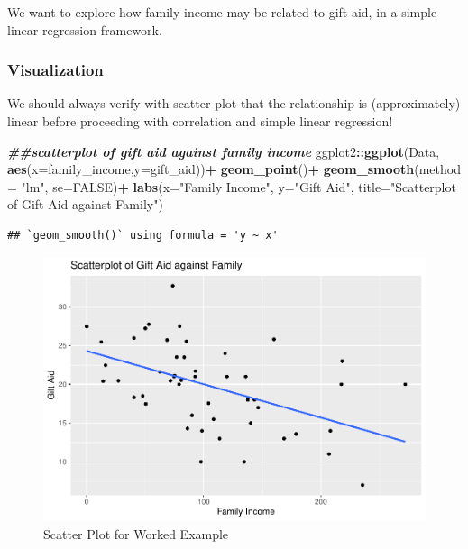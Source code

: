 \documentclass[
]{book}
\newenvironment{Shaded}{\begin{snugshade}}{\end{snugshade}}
\newcommand{\AttributeTok}[1]{\textcolor[rgb]{0.13,0.29,0.53}{#1}}
\newcommand{\ConstantTok}[1]{\textcolor[rgb]{0.56,0.35,0.01}{#1}}
\newcommand{\DocumentationTok}[1]{\textcolor[rgb]{0.56,0.35,0.01}{\textbf{\textit{#1}}}}
\newcommand{\FunctionTok}[1]{\textcolor[rgb]{0.13,0.29,0.53}{\textbf{#1}}}
\newcommand{\NormalTok}[1]{#1}
\newcommand{\SpecialCharTok}[1]{\textcolor[rgb]{0.81,0.36,0.00}{\textbf{#1}}}
\newcommand{\StringTok}[1]{\textcolor[rgb]{0.31,0.60,0.02}{#1}}
\begin{document}
We want to explore how family income may be related to gift aid, in a simple linear regression framework.

\subsubsection*{Visualization}\label{visualization}

We should always verify with scatter plot that the relationship is (approximately) linear before proceeding with correlation and simple linear regression!

\begin{Shaded}
\begin{Highlighting}[]
\DocumentationTok{\#\#scatterplot of gift aid against family income}
\NormalTok{ggplot2}\SpecialCharTok{::}\FunctionTok{ggplot}\NormalTok{(Data, }\FunctionTok{aes}\NormalTok{(}\AttributeTok{x=}\NormalTok{family\_income,}\AttributeTok{y=}\NormalTok{gift\_aid))}\SpecialCharTok{+}
  \FunctionTok{geom\_point}\NormalTok{()}\SpecialCharTok{+}
  \FunctionTok{geom\_smooth}\NormalTok{(}\AttributeTok{method =} \StringTok{"lm"}\NormalTok{, }\AttributeTok{se=}\ConstantTok{FALSE}\NormalTok{)}\SpecialCharTok{+}
  \FunctionTok{labs}\NormalTok{(}\AttributeTok{x=}\StringTok{"Family Income"}\NormalTok{, }\AttributeTok{y=}\StringTok{"Gift Aid"}\NormalTok{, }\AttributeTok{title=}\StringTok{"Scatterplot of Gift Aid against Family"}\NormalTok{)}
\end{Highlighting}
\end{Shaded}

\begin{verbatim}
## `geom_smooth()` using formula = 'y ~ x'
\end{verbatim}

\begin{figure}
\centering
\includegraphics{bookdown-demo_files/figure-latex/10-scatter-eg-1.pdf}
\caption{\label{fig:10-scatter-eg}Scatter Plot for Worked Example}
\end{figure}
\end{document}
